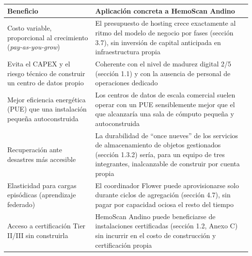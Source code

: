 \documentclass[11pt,a4paper]{article}
\begin{document}
{\small
\begin{longtable}[]{@{}
  >{\raggedright\arraybackslash}p{}
  >{\raggedright\arraybackslash}p{}@{}}
\toprule\noalign{}
\begin{minipage}[b]{\linewidth}\raggedright
Beneficio
\end{minipage} & \begin{minipage}[b]{\linewidth}\raggedright
Aplicación concreta a HemoScan Andino
\end{minipage} \\
\midrule\noalign{}
\endhead
\bottomrule\noalign{}
\endlastfoot
Costo variable, proporcional al crecimiento (\emph{pay-as-you-grow}) & El presupuesto de hosting crece exactamente al ritmo del modelo de negocio por fases (sección 3.7), sin inversión de capital anticipada en infraestructura propia \\
Evita el CAPEX y el riesgo técnico de construir un centro de datos propio & Coherente con el nivel de madurez digital 2/5 (sección 1.1) y con la ausencia de personal de operaciones dedicado \\
Mejor eficiencia energética (PUE) que una instalación pequeña autoconstruida & Los centros de datos de escala comercial suelen operar con un PUE sensiblemente mejor que el que alcanzaría una sala de cómputo pequeña y autoconstruida \\
Recuperación ante desastres más accesible & La durabilidad de ``once nueves'' de los servicios de almacenamiento de objetos gestionados (sección 1.3.2) sería, para un equipo de tres integrantes, inalcanzable de construir por cuenta propia \\
Elasticidad para cargas episódicas (aprendizaje federado) & El coordinador Flower puede aprovisionarse solo durante ciclos de agregación (sección 4.7), sin pagar por capacidad ociosa el resto del tiempo \\
Acceso a certificación Tier II/III sin construirla & HemoScan Andino puede beneficiarse de instalaciones certificadas (sección 1.2, Anexo C) sin incurrir en el costo de construcción y certificación propia \\
\end{longtable}
}
\end{document}
